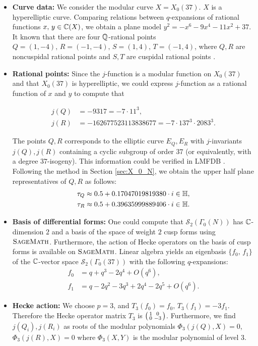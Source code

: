 \begin{itemize}
\item \textbf{Curve data: } We consider the modular curve $X = X_0(37)$. $X$ is a hyperelliptic curve. Comparing relations between $q$-expansions of rational functions $x,\,y \in \mathbb{C}(X)$, we obtain a plane model $y^2 = - x^6 - 9x^4 - 11x^2 + 37$. It known that there are four $\mathbb{Q}$-rational points $Q = (1,-4),\,R = (-1,-4),\, S=(1,4),\,T = (-1,4)$, where $Q,R$ are noncuspidal rational points and $S,T$ are cuspidal rational points \cite{maswd}.

\item \textbf{Rational points:}  Since the $j$-function is a
modular function on $X_0(37)$ and that $X_0(37)$ is hyperelliptic, we could
express $j$-function as a rational function of $x$ and $y$ to compute
that

\begin{align*}
  j(Q) &= -9317 = - 7 \cdot 11^3, \\
  j(R) &= -162677523113838677= - 7 \cdot 137^3 \cdot 2083^3.
\end{align*}
          

The points $Q,R$ corresponds to the elliptic curve $E_Q,E_R$ with
$j$-invariants $j(Q),j(R)$ containing a cyclic subgroup of order $37$ (or equivalently, with a degree $37$-isogeny). This information could be verified in LMFDB \cite{lmfdb}. Following the method in Section \ref{sec:X_0_N}, we obtain the upper half plane representatives of $Q,R$ as follows: \begin{align*} \tau_Q &\approx 0.5 + 0.17047019819380\cdot i \in \mathbb{H} , \\ \tau_R &\approx 0.5 + 0.39635999889406\cdot i \in \mathbb{H}. \end{align*} 


\item \textbf{Basis of differential forms:} One could compute that $\mathcal{S}_2(\Gamma_0(N))$ has $\mathbb{C}$-dimension $2$ and a basis of the space of weight $2$ cusp forms using $\textsc{SageMath}$. Furthermore, the action of Hecke operators on the basis of cusp forms is available on $\textsc{SageMath}$. Linear algebra yields an eigenbasis $\{f_0,\,f_1\}$ of the $\mathbb{C}$-vector space $\mathcal{S}_2(\Gamma_0(37))$ with the following $q$-expansions:
\begin{align*} f_0 &= q+q^3-2q^4+O(q^6), \\ f_1 &= q-2q^2-3q^3+2q^4-2q^5+O(q^6) .\end{align*}

\item \textbf{Hecke action:} We choose $p=3$, and $T_3(f_0) = f_0,\,T_3(f_1) = -3f_1$. Therefore the Hecke operator matrix $T_3$ is $\begin{psmallmatrix}
1&0\\
0&-3
\end{psmallmatrix}$. Furthermore, we find $j(Q_i), j(R_i)$ as roots of the modular polynomials $\Phi_3(j(Q),X) = 0$, $\Phi_3(j(R),X) = 0$ where $\Phi_3(X,Y)$ is the modular polynomial of level $3$. 


\end{itemize}
